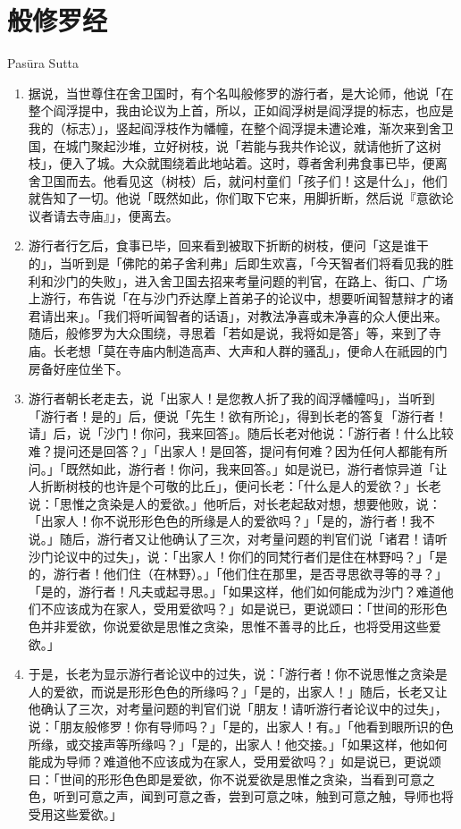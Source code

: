 \section{般修罗经}

\begin{center}Pasūra Sutta\end{center}\vspace{1em}

\begin{enumerate}\item 据说，当世尊住在舍卫国时，有个名叫般修罗的游行者，是大论师，他说「在整个阎浮提中，我由论议为上首，所以，正如阎浮树是阎浮提的标志，也应是我的（标志）」，竖起阎浮枝作为幡幢，在整个阎浮提未遭论难，渐次来到舍卫国，在城门聚起沙堆，立好树枝，说「若能与我共作论议，就请他折了这树枝」，便入了城。大众就围绕着此地站着。这时，尊者舍利弗食事已毕，便离舍卫国而去。他看见这（树枝）后，就问村童们「孩子们！这是什么」，他们就告知了一切。他说「既然如此，你们取下它来，用脚折断，然后说『意欲论议者请去寺庙』」，便离去。
\item 游行者行乞后，食事已毕，回来看到被取下折断的树枝，便问「这是谁干的」，当听到是「佛陀的弟子舍利弗」后即生欢喜，「今天智者们将看见我的胜利和沙门的失败」，进入舍卫国去招来考量问题的判官，在路上、街口、广场上游行，布告说「在与沙门乔达摩上首弟子的论议中，想要听闻智慧辩才的诸君请出来」。「我们将听闻智者的话语」，对教法净喜或未净喜的众人便出来。随后，般修罗为大众围绕，寻思着「若如是说，我将如是答」等，来到了寺庙。长老想「莫在寺庙内制造高声、大声和人群的骚乱」，便命人在祇园的门房备好座位坐下。
\item 游行者朝长老走去，说「出家人！是您教人折了我的阎浮幡幢吗」，当听到「游行者！是的」后，便说「先生！欲有所论」，得到长老的答复「游行者！请」后，说「沙门！你问，我来回答」。随后长老对他说：「游行者！什么比较难？提问还是回答？」「出家人！是回答，提问有何难？因为任何人都能有所问。」「既然如此，游行者！你问，我来回答。」如是说已，游行者惊异道「让人折断树枝的也许是个可敬的比丘」，便问长老：「什么是人的爱欲？」长老说：「思惟之贪染是人的爱欲。」他听后，对长老起敌对想，想要他败，说：「出家人！你不说形形色色的所缘是人的爱欲吗？」「是的，游行者！我不说。」随后，游行者又让他确认了三次，对考量问题的判官们说「诸君！请听沙门论议中的过失」，说：「出家人！你们的同梵行者们是住在林野吗？」「是的，游行者！他们住（在林野）。」「他们住在那里，是否寻思欲寻等的寻？」「是的，游行者！凡夫或起寻思。」「如果这样，他们如何能成为沙门？难道他们不应该成为在家人，受用爱欲吗？」如是说已，更说颂曰：「世间的形形色色并非爱欲，你说爱欲是思惟之贪染，思惟不善寻的比丘，也将受用这些爱欲。」
\item 于是，长老为显示游行者论议中的过失，说：「游行者！你不说思惟之贪染是人的爱欲，而说是形形色色的所缘吗？」「是的，出家人！」随后，长老又让他确认了三次，对考量问题的判官们说「朋友！请听游行者论议中的过失」，说：「朋友般修罗！你有导师吗？」「是的，出家人！有。」「他看到眼所识的色所缘，或交接声等所缘吗？」「是的，出家人！他交接。」「如果这样，他如何能成为导师？难道他不应该成为在家人，受用爱欲吗？」如是说已，更说颂曰：「世间的形形色色即是爱欲，你不说爱欲是思惟之贪染，当看到可意之色，听到可意之声，闻到可意之香，尝到可意之味，触到可意之触，导师也将受用这些爱欲。」

\end{enumerate}
